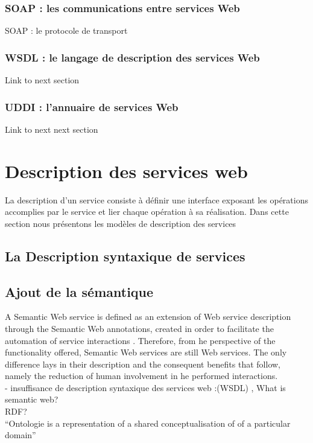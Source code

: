 	 \subsubsection{SOAP : les communications entre services Web } 
	     SOAP : le protocole de transport 
	 \subsubsection{WSDL : le langage de description des services Web}
	     Link to next section
	 \subsubsection{UDDI : l’annuaire de services Web }
	     Link to next next section

\section{Description des services web} 
    La description d’un service consiste à définir une interface exposant les opérations accomplies par le service et 
    lier chaque opération à sa réalisation. Dans cette section nous présentons les modèles de description des services
    	\subsection{La Description syntaxique de services}
        \subsection{Ajout de la sémantique}
	    A Semantic Web service is defined as an extension of Web service description through the Semantic Web annotations,
	    created in order to facilitate the automation of service interactions \cite{mcilraith2001semantic}. Therefore, from 
	    he perspective of the functionality offered, Semantic Web services are still Web services. The only difference lays
	    in their description and the consequent benefits that follow, namely the reduction of human involvement in 
	    he performed interactions.\cite{vargas2009challenges}\\

	    - insuffisance de description syntaxique des services web :(WSDL)
	    \cite{decker2000semantic}, \cite{sivashanmugam2003adding} What is semantic web? \\
	     RDF? \cite{lassila1999resource}\\
	    ``Ontologie is a representation of a shared conceptualisation of of a particular domain'' 
	     \cite{decker2000semantic}\\

